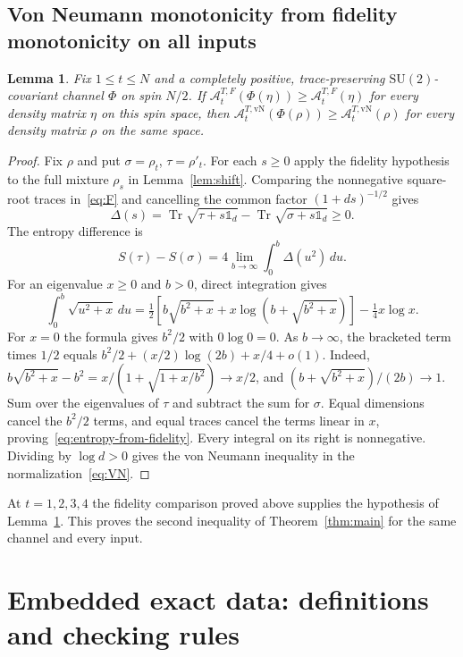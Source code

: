 \documentclass[11pt,a4paper]{article}
\newcommand{\A}{\mathcal A}
\newcommand{\Tr}{\operatorname{Tr}}
\newcommand{\id}{\mathds{1}}
\newtheorem{lemma}{Lemma}
\begin{document}
\subsection{Von Neumann monotonicity from fidelity monotonicity on all inputs}\label{sec:fidelity-implies-entropy}
\begin{lemma}\label{lem:fidelity-implies-entropy}
Fix $1\le t\le N$ and a completely positive, trace-preserving
$\mathrm{SU}(2)$-covariant channel $\Phi$ on spin $N/2$.
If $\A_t^{T,F}(\Phi(\eta))\ge\A_t^{T,F}(\eta)$ for every density matrix
$\eta$ on this spin space, then
$\A_t^{T,\mathrm{vN}}(\Phi(\rho))\ge\A_t^{T,\mathrm{vN}}(\rho)$ for every
density matrix $\rho$ on the same space.
\end{lemma}
\begin{proof}
Fix $\rho$ and put $\sigma=\rho_t$, $\tau=\rho'_t$. For each $s\ge0$
apply the fidelity hypothesis to the full mixture $\rho_s$ in
Lemma~\ref{lem:shift}. Comparing the nonnegative square-root traces in~\eqref{eq:F}
and cancelling the common factor $(1+ds)^{-1/2}$ gives
\[
 \Delta(s)=\Tr\sqrt{\tau+s\id_d}-\Tr\sqrt{\sigma+s\id_d}\ge0 .
\]
The entropy difference is
\begin{equation}\label{eq:entropy-from-fidelity}
 S(\tau)-S(\sigma)=4\lim_{b\to\infty}\int_0^b\Delta(u^2)\,du .
\end{equation}
For an eigenvalue $x\ge0$ and $b>0$, direct integration gives
\[
 \int_0^b\sqrt{u^2+x}\,du
 =\tfrac12\!\left[b\sqrt{b^2+x}+x\log\!\left(b+\sqrt{b^2+x}\right)\right]
   -\tfrac14 x\log x .
\]
For $x=0$ the formula gives $b^2/2$ with $0\log0=0$. As $b\to\infty$,
the bracketed term times $1/2$ equals
$b^2/2+(x/2)\log(2b)+x/4+o(1)$. Indeed,
$b\sqrt{b^2+x}-b^2=x/(1+\sqrt{1+x/b^2})\to x/2$, and
$(b+\sqrt{b^2+x})/(2b)\to1$.
Sum over the eigenvalues of $\tau$ and subtract the sum for $\sigma$.
Equal dimensions cancel the $b^2/2$ terms, and equal traces cancel the
terms linear in $x$, proving~\eqref{eq:entropy-from-fidelity}.
Every integral on its right is nonnegative. Dividing by $\log d>0$
gives the von Neumann inequality in the normalization~\eqref{eq:VN}.
\end{proof}

At $t=1,2,3,4$ the fidelity comparison proved above supplies the hypothesis
of Lemma~\ref{lem:fidelity-implies-entropy}. This proves the second
inequality of Theorem~\ref{thm:main} for the same channel and every input.

\section{Embedded exact data: definitions and checking rules}\label{sec:data}
\end{document}
